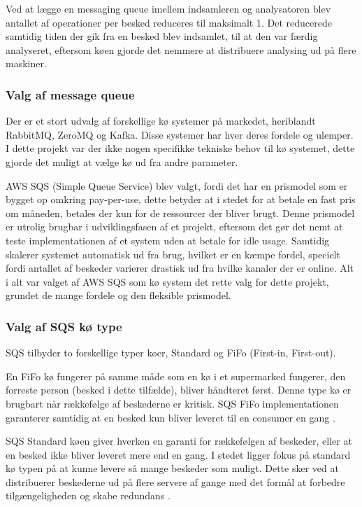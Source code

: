 \documentclass{article}
\begin{document}
Ved at lægge en messaging queue imellem indsamleren og analysatoren blev antallet af operationer per besked reduceres til maksimalt 1. Det reducerede samtidig tiden der gik fra en besked blev indsamlet, til at den var færdig analyseret, eftersom køen gjorde det nemmere at distribuere analysing ud på flere maskiner.

\subsubsection{Valg af message queue}
Der er et stort udvalg af forskellige kø systemer på markedet, heriblandt RabbitMQ, ZeroMQ og Kafka. Disse systemer har hver deres fordele og ulemper. I dette projekt var der ikke nogen specifikke tekniske behov til kø systemet, dette gjorde det muligt at vælge kø ud fra andre parameter.

AWS SQS (Simple Queue Service) blev valgt, fordi det har en prismodel som er bygget op omkring pay-per-use, dette betyder at i stedet for at betale en fast pris om måneden, betales der kun for de ressourcer der bliver brugt. Denne prismodel er utrolig brugbar i udviklingsfasen af et projekt, eftersom det gør det nemt at teste implementationen af et system uden at betale for idle usage. Samtidig skalerer systemet automatisk ud fra brug, hvilket er en kæmpe fordel, specielt fordi antallet af beskeder varierer drastisk ud fra hvilke kanaler der er online.
Alt i alt var valget af AWS SQS som kø system det rette valg for dette projekt, grundet de mange fordele og den fleksible prismodel.

\subsubsection{Valg af SQS kø type}
SQS tilbyder to forskellige typer køer, Standard og FiFo (First-in, First-out).

En FiFo kø fungerer på samme måde som en kø i et supermarked fungerer, den forreste person (besked i dette tilfælde), bliver håndteret først. Denne type kø er brugbart når rækkefølge af beskederne er kritisk. SQS FiFo implementationen garanterer samtidig at en besked kun bliver leveret til en consumer en gang \cite{amazon_sqs_queue_types}.

SQS Standard køen giver hverken en garanti for rækkefølgen af beskeder, eller at en besked ikke bliver leveret mere end en gang. I stedet ligger fokus på standard kø typen på at kunne levere så mange beskeder som muligt. Dette sker ved at distribuerer beskederne ud på flere servere af gange med det formål at forbedre tilgængeligheden og skabe redundans \cite{amazon-standard-queue}.
\end{document}
